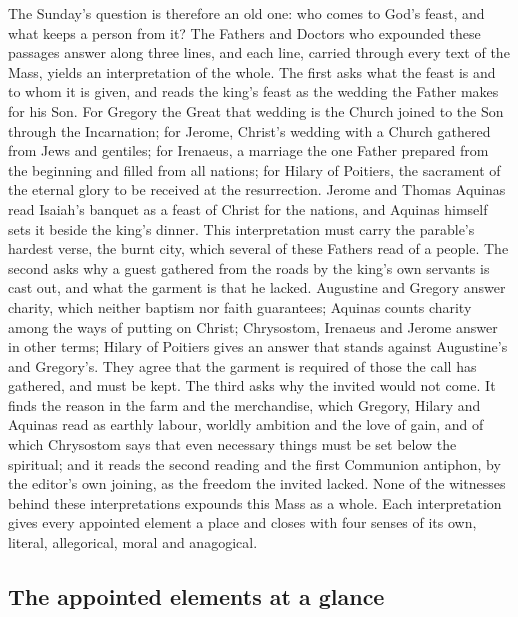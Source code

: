 The Sunday's question is therefore an old one: who comes to God's feast, and
what keeps a person from it? The Fathers and Doctors who expounded these
passages answer along three lines, and each line, carried through every text
of the Mass, yields an interpretation of the whole. The first asks what the
feast is and to whom it is given, and reads the king's feast as the wedding
the Father makes for his Son. For Gregory the Great that wedding is the Church
joined to the Son through the Incarnation; for Jerome, Christ's wedding with a
Church gathered from Jews and gentiles; for Irenaeus, a marriage the one
Father prepared from the beginning and filled from all nations; for Hilary of
Poitiers, the sacrament of the eternal glory to be received at the
resurrection. Jerome and Thomas Aquinas read Isaiah's banquet as a feast of
Christ for the nations, and Aquinas himself sets it beside the king's dinner.
This interpretation must carry the parable's hardest verse, the burnt city,
which several of these Fathers read of a people. The second asks why a guest
gathered from the roads by the king's own servants is cast out, and what the
garment is that he lacked. Augustine and Gregory answer charity, which neither
baptism nor faith guarantees; Aquinas counts charity among the ways of putting
on Christ; Chrysostom, Irenaeus and Jerome answer in other terms; Hilary of
Poitiers gives an answer that stands against Augustine's and Gregory's. They
agree that the garment is required of those the call has gathered, and must be
kept. The third asks why the invited would not come. It finds the reason in
the farm and the merchandise, which Gregory, Hilary and Aquinas read as
earthly labour, worldly ambition and the love of gain, and of which Chrysostom
says that even necessary things must be set below the spiritual; and it reads
the second reading and the first Communion antiphon, by the editor's own
joining, as the freedom the invited lacked. None of the witnesses behind these
interpretations expounds this Mass as a whole. Each interpretation gives every
appointed element a place and closes with four senses of its own, literal,
allegorical, moral and anagogical.

\subsection{The appointed elements at a glance}

